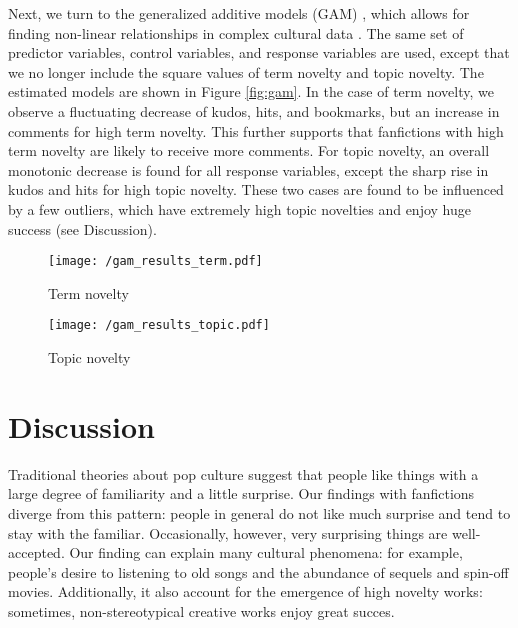 \documentclass[letterpaper]{article} %
\begin{document}
Next, we turn to the generalized additive models (GAM) \cite{wood2006generalized}, which allows for finding non-linear relationships in complex cultural data \cite{horvat2018role}. The same set of predictor variables, control variables, and response variables are used, except that we no longer include the square values of term novelty and topic novelty. The estimated models are shown in Figure \ref{fig:gam}. In the case of term novelty, we observe a fluctuating decrease of kudos, hits, and bookmarks, but an increase in comments for high term novelty. This further supports that fanfictions with high term novelty are likely to receive more comments. For topic novelty, an overall monotonic decrease is found for all response variables, except the sharp rise in kudos and hits for high topic novelty. These two cases are found to be influenced by a few outliers, which have extremely high topic novelties and enjoy huge success (see Discussion). 

\begin{figure*}
    \centering
    \begin{subfigure}{\textwidth}
          \texttt{[image: /gam\_results\_term.pdf]}
  		\caption{Term novelty} 
			\label{fig:gam_term}
       \end{subfigure}
      \begin{subfigure}{\textwidth}
          \texttt{[image: /gam\_results\_topic.pdf]}
		\caption{Topic novelty} 
		\label{fig:gam_topic}
       \end{subfigure}
           	\caption{Results of the Generalized Additive Models. 95\% confidence intervals are plotted.}
        \label{fig:gam}
\end{figure*}



\section*{Discussion}
Traditional theories about pop culture suggest that people like things with a large degree of familiarity and a little surprise. Our findings with fanfictions diverge from this pattern: people in general do not like much surprise and tend to stay with the familiar. Occasionally, however, very surprising things are well-accepted. Our finding can explain many cultural phenomena: for example, people's desire to listening to old songs and the abundance of sequels and spin-off movies. Additionally, it also account for the emergence of high novelty works: sometimes, non-stereotypical creative works enjoy great succes.
\end{document}
